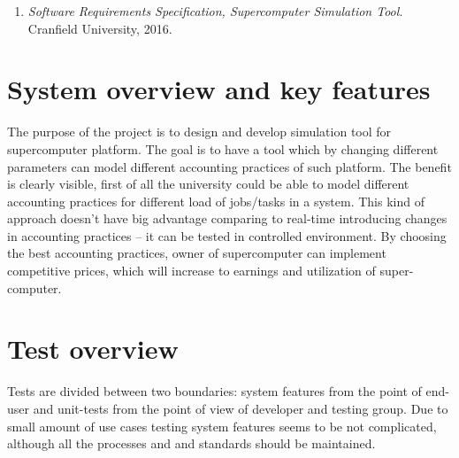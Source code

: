 	\begin{enumerate}
		\item \emph{Software Requirements Specification, Supercomputer Simulation Tool}. Cranfield University, 2016. 
	\end{enumerate}
\section{System overview and key features} \label{s:introduction:system-overview-and-key-features}
	\begin{comment}
		$<$Describe the mission or business purpose of the system or software product under test (or reference where the information can be found, e.g., in a system definition document, such as a Concept of
		Operations). Describe the key features of the system or software under test [or reference where the information can be found, e.g., in a requirements document or COTS documentation]. $>$
	\end{comment}
	The purpose of the project is to design and develop simulation tool for supercomputer
	platform. The goal is to have a tool which by changing different parameters can model
	different accounting practices of such platform. The benefit is clearly visible, first of all
	the university could be able to model different accounting practices for different load of
	jobs/tasks in a system. This kind of approach doesn't have big advantage comparing
	to real-time introducing changes in accounting practices -- it can be tested in controlled environment. By choosing the best accounting practices, owner of supercomputer can implement competitive prices, which will increase to earnings and utilization of super-computer.
\section{Test overview} \label{s:introduction:test-overview}
	\begin{comment}
		$<$Describe the test organization, test schedule, integrity level scheme, test resources, responsibilities, tools, techniques, and methods necessary to perform the testing. $>$
	\end{comment}
	
	Tests are divided between two boundaries: system features from the point of end-user and unit-tests from the point of view of developer and testing group. Due to small amount of use cases testing system features seems to be not complicated, although all the processes and and standards should be maintained.
	
